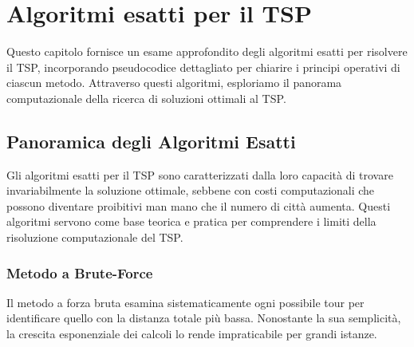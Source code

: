 
%

\makeatletter
\newcommand{\ntifpkgloaded}{%
	\@ifpackageloaded%
}
\makeatother

\chapter{Algoritmi esatti per il \gls{TSP}} \label{chapt:3}

Questo capitolo fornisce un esame approfondito degli algoritmi esatti per risolvere il \gls{TSP}, incorporando pseudocodice dettagliato per chiarire i principi operativi di ciascun metodo. Attraverso questi algoritmi, esploriamo il panorama computazionale della ricerca di soluzioni ottimali al \gls{TSP}.

\section{Panoramica degli Algoritmi Esatti}

Gli algoritmi esatti per il \gls{TSP} sono caratterizzati dalla loro capacità di trovare invariabilmente la soluzione ottimale, sebbene con costi computazionali che possono diventare proibitivi man mano che il numero di città aumenta. Questi algoritmi servono come base teorica e pratica per comprendere i limiti della risoluzione computazionale del \gls{TSP}.

\subsection{Metodo a Brute-Force}

Il metodo a forza bruta esamina sistematicamente ogni possibile tour per identificare quello con la distanza totale più bassa. Nonostante la sua semplicità, la crescita esponenziale dei calcoli lo rende impraticabile per grandi istanze.

